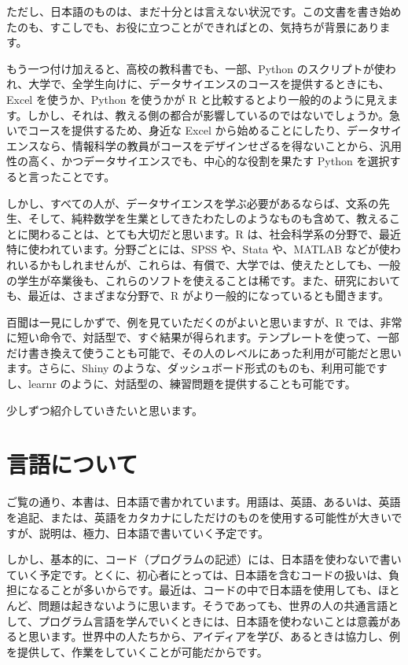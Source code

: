\documentclass[
  xelatex, ja=standard]{bxjsbook}
\theoremstyle{definition}
\theoremstyle{definition}
\theoremstyle{definition}
\theoremstyle{definition}
\theoremstyle{remark}
\begin{document}
ただし、日本語のものは、まだ十分とは言えない状況です。この文書を書き始めたのも、すこしでも、お役に立つことができればとの、気持ちが背景にあります。

もう一つ付け加えると、高校の教科書でも、一部、Python のスクリプトが使われ、大学で、全学生向けに、データサイエンスのコースを提供するときにも、Excel を使うか、Python を使うかが R と比較するとより一般的のように見えます。しかし、それは、教える側の都合が影響しているのではないでしょうか。急いでコースを提供するため、身近な Excel から始めることにしたり、データサイエンスなら、情報科学の教員がコースをデザインせざるを得ないことから、汎用性の高く、かつデータサイエンスでも、中心的な役割を果たす Python を選択すると言ったことです。

しかし、すべての人が、データサイエンスを学ぶ必要があるならば、文系の先生、そして、純粋数学を生業としてきたわたしのようなものも含めて、教えることに関わることは、とても大切だと思います。R は、社会科学系の分野で、最近特に使われています。分野ごとには、SPSS や、Stata や、MATLAB などが使われいるかもしれませんが、これらは、有償で、大学では、使えたとしても、一般の学生が卒業後も、これらのソフトを使えることは稀です。また、研究においても、最近は、さまざまな分野で、R がより一般的になっているとも聞きます。

百聞は一見にしかずで、例を見ていただくのがよいと思いますが、R では、非常に短い命令で、対話型で、すぐ結果が得られます。テンプレートを使って、一部だけ書き換えて使うことも可能で、その人のレベルにあった利用が可能だと思います。さらに、Shiny のような、ダッシュボード形式のものも、利用可能ですし、learnr のように、対話型の、練習問題を提供することも可能です。

少しずつ紹介していきたいと思います。

\hypertarget{ux8a00ux8a9eux306bux3064ux3044ux3066}{%
\section*{言語について}\label{ux8a00ux8a9eux306bux3064ux3044ux3066}}

ご覧の通り、本書は、日本語で書かれています。用語は、英語、あるいは、英語を追記、または、英語をカタカナにしただけのものを使用する可能性が大きいですが、説明は、極力、日本語で書いていく予定です。

しかし、基本的に、コード（プログラムの記述）には、日本語を使わないで書いていく予定です。とくに、初心者にとっては、日本語を含むコードの扱いは、負担になることが多いからです。最近は、コードの中で日本語を使用しても、ほとんど、問題は起きないように思います。そうであっても、世界の人の共通言語として、プログラム言語を学んでいくときには、日本語を使わないことは意義があると思います。世界中の人たちから、アイディアを学び、あるときは協力し、例を提供して、作業をしていくことが可能だからです。
\end{document}
